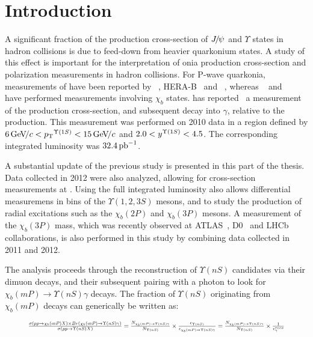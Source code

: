 \section{Introduction}
\label{sec:introduction}

A significant fraction of the production cross-section of ${{J\mskip -3mu/\mskip -2mu\psi\mskip 2mu}}$ and
$\Upsilon$ states in hadron collisions is due to feed-down from heavier
quarkonium states. A study of this effect is important for the interpretation of
onia production cross-section and polarization measurements in hadron
collisions. For P-wave quarkonia, measurements of \chic have been reported by
\cdf~\cite{Abulencia:2007bra}, HERA-B~\cite{Abt:2008ed}
and \lhcb~\cite{LHCb-PAPER-2011-019}, whereas \cdf~\cite{Affolder:1999wm} and 
\atlas~\cite{Aad:2011ih} have performed measurements involving $\chi_b$ states.
\lhcb has reported~\cite{LHCb-PAPER-2012-015} a measurement of
the \chibOneP production cross-section, and subsequent decay into \OneS $\gamma$,
relative to the \OneS production. This measurement was performed on 2010 data
in a region defined by $6 \gevc < \pt^{\Y1S} < 15 \gevc$ and
$2.0 < y^{\Y1S} < 4.5$.
The corresponding integrated luminosity was $32.4\mbox{\,pb}^{-1}$.

A substantial update of the previous \lhcb study is presented in this part of the thesis. Data collected in
2012 were also analyzed, allowing for cross-section measurements at \tev.
Using the full integrated luminosity also allows differential measuremens in \pt 
bins of the $\Upsilon(1,2,3S)$
mesons, and to study the production of radial excitations such as the 
$\chi_b(2P)$ and $\chi_b(3P)$ mesons. A
measurement of the $\chi_b(3P)$ mass, which was recently observed at
ATLAS~\cite{Aad:2011ih}, D0~\cite{Abazov:2012gh} and
LHCb~\cite{LHCb-CONF-2012-020} collaborations, is also performed in this study
by combining data collected in 2011 and 2012.

The analysis proceeds through the reconstruction of $\Upsilon(nS)$ candidates
via their dimuon decays, and their subsequent pairing with a photon to look for
$\chi_b(mP) \to \Upsilon(nS) \gamma$ decays.  The fraction of $\Upsilon(nS)$
originating from $\chi_b(mP)$ decays can generically be written as:

\begin{equation}
\resizebox{.9\hsize}{!}{
$
\frac{\sigma(pp \to \chi_b (mP) X) \times Br (\chi_b (mP) \to \Upsilon(nS) \gamma)}{\sigma(pp \to \Upsilon(nS) X)} =
\frac{N_{\chi_b (mP)\to \Upsilon(nS) \gamma}}{N_{\Upsilon(nS)}} \times \frac{\epsilon_{\Upsilon(nS)}}{\epsilon_{\chi_b (mP)\to \Upsilon(nS) \gamma}} =
\frac{N_{\chi_b (mP)\to \Upsilon(nS) \gamma}}{N_{\Upsilon(nS)}} \times \frac{1}{\epsilon^{reco}_{\gamma}}
$
}
\label{eqn:master}
\end{equation}



